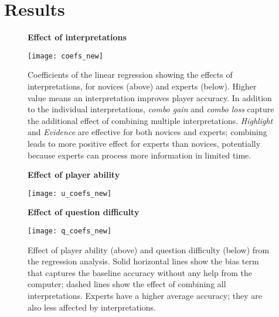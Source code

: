\section{Results}
\label{sec:results}


\begin{figure}[t]
    \centering
    \textbf{Effect of interpretations}\par\medskip
    \texttt{[image: coefs\_new]}
    \caption{\label{fig:coefs} Coefficients of the linear regression
    showing the effects of interpretations, for novices (above) and
    experts (below).
    Higher value means an interpretation improves player accuracy.
    In addition to the individual interpretations, \emph{combo gain}
    and \emph{combo loss} capture the additional effect of combining
    multiple interpretations. \emph{Highlight} and \emph{Evidence}
    are effective for both novices and experts; combining leads to
    more positive effect for experts than novices, potentially because
    experts can process more information in limited time.}
\end{figure}

\begin{figure}[t]
    \centering
    \textbf{Effect of player ability}\par\medskip
    \texttt{[image: u\_coefs\_new]}
    \par\medskip
    \textbf{Effect of question difficulty}\par\medskip
    \texttt{[image: q\_coefs\_new]}
    \caption{\label{fig:uq_coefs} Effect of player ability (above) and
    question difficulty (below) from the regression analysis. Solid
    horizontal lines show the bias term that captures the baseline
    accuracy without any help from the computer;
    dashed lines show the effect of combining all
    interpretations.  Experts have a higher average accuracy; they are
    also less affected by interpretations.}
\end{figure}

